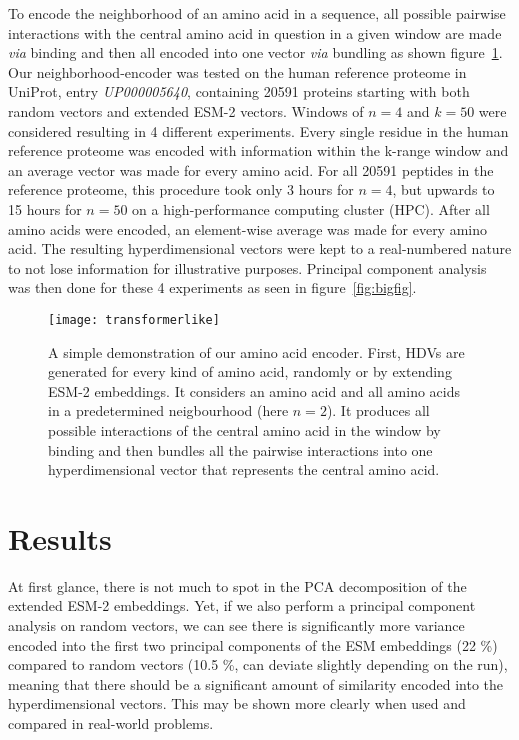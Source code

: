 To encode the neighborhood of an amino acid in a sequence, all possible pairwise interactions with the central amino acid in question in a given window are made \textit{via} binding and then all encoded into one vector \textit{via} bundling as shown figure~\ref{fig:AAtr}. Our neighborhood-encoder was tested on the human reference proteome in UniProt, entry \textit{UP000005640}, containing 20591 proteins starting with both random vectors and extended ESM-2 vectors. Windows of $n = 4$ and $k = 50$ were considered resulting in 4 different experiments. Every single residue in the human reference proteome was encoded with information within the k-range window and an average vector was made for every amino acid. For all 20591 peptides in the reference proteome, this procedure took only 3 hours for $n = 4$, but upwards to 15 hours for $n = 50$ on a high-performance computing cluster (HPC). After all amino acids were encoded, an element-wise average was made for every amino acid. The resulting hyperdimensional vectors were kept to a real-numbered nature to not lose information for illustrative purposes. Principal component analysis was then done for these 4 experiments as seen in figure~\ref{fig:bigfig}. 

\begin{figure}[H]
    \centering
    \texttt{[image: transformerlike]}
    \caption{A simple demonstration of our amino acid encoder. First, HDVs are generated for every kind of amino acid, randomly or by extending ESM-2 embeddings. It considers an amino acid and all amino acids in a predetermined neigbourhood (here $n = 2$). It produces all possible interactions of the central amino acid in the window by binding and then bundles all the pairwise interactions into one hyperdimensional vector that represents the central amino acid.}
    \label{fig:AAtr}
\end{figure}


\section{Results}
At first glance, there is not much to spot in the PCA decomposition of the extended ESM-2 embeddings. Yet, if we also perform a principal component analysis on random vectors, we can see there is significantly more variance encoded into the first two principal components of the ESM embeddings (22 \%) compared to random vectors (10.5 \%, can deviate slightly depending on the run), meaning that there should be a significant amount of similarity encoded into the hyperdimensional vectors. This may be shown more clearly when used and compared in real-world problems.


